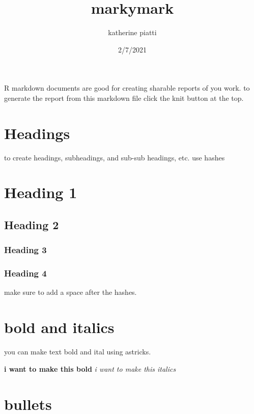 \documentclass[
]{article}
\title{markymark}
\author{katherine piatti}
\date{2/7/2021}
\begin{document}
\maketitle

R markdown documents are good for creating sharable reports of you work.
to generate the report from this markdown file click the knit button at
the top.

\hypertarget{headings}{%
\section{Headings}\label{headings}}

to create headings, subheadings, and sub-sub headings, etc. use hashes

\hypertarget{heading-1}{%
\section{Heading 1}\label{heading-1}}

\hypertarget{heading-2}{%
\subsection{Heading 2}\label{heading-2}}

\hypertarget{heading-3}{%
\subsubsection{Heading 3}\label{heading-3}}

\hypertarget{heading-4}{%
\subsubsection{Heading 4}\label{heading-4}}

make sure to add a space after the hashes.

\hypertarget{bold-and-italics}{%
\section{bold and italics}\label{bold-and-italics}}

you can make text bold and ital using astricks.

\textbf{i want to make this bold} \emph{i want to make this italics}

\hypertarget{bullets}{%
\section{bullets}\label{bullets}}
\end{document}
